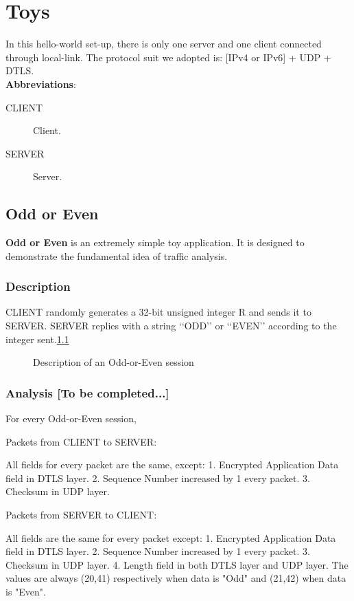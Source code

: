 \chapter{Toys}

In this hello-world set-up, there is only one server and one client connected through local-link. The protocol suit we adopted is: [IPv4 or IPv6] + UDP + DTLS.  
\\
\textbf{Abbreviations}:
\begin{description}
\item[CLIENT] Client.
\item[SERVER] Server.
\end{description}



\section{Odd or Even}
\textbf{Odd or Even} is an extremely simple toy application. It is designed to demonstrate the fundamental idea of traffic analysis.

\subsection{Description}
CLIENT randomly generates a 32-bit unsigned integer R and sends it to SERVER. SERVER replies with a string \lq\lq{}ODD\rq\rq{} or \lq\lq{}EVEN\rq\rq{} according to the integer sent.\ref{Fig: Odd or Even}

\begin{figure}[H] \label{Fig: Odd or Even}
\caption{Description of an Odd-or-Even session}
\centering
\resizebox{8cm}{!}
{}
\end{figure}

\subsection{Analysis [To be completed...]}

For every Odd-or-Even session, 

Packets from CLIENT to SERVER:

All fields for every packet are the same, except:
1. Encrypted Application Data field in DTLS layer.
2. Sequence Number increased by 1 every packet.
3. Checksum in UDP layer.

Packets from SERVER to CLIENT:

All fields are the same for every packet except:
1. Encrypted Application Data field in DTLS layer.
2. Sequence Number increased by 1 every packet.
3. Checksum in UDP layer.
4. Length field in both DTLS layer and UDP layer. The values are always (20,41) respectively when data is "Odd" and (21,42) when data is "Even".


